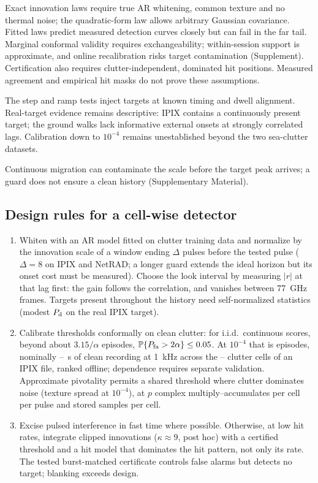 \documentclass[journal]{IEEEtran}
\newcommand{\PP}{\mathbb{P}}
\begin{document}
Exact innovation laws require true AR whitening, common texture and no thermal noise; the quadratic-form law allows arbitrary Gaussian covariance. Fitted laws predict measured detection curves closely but can fail in the far tail. Marginal conformal validity requires exchangeability; within-session support is approximate, and online recalibration risks target contamination (Supplement). Certification also requires clutter-independent, dominated hit positions. Measured agreement and empirical hit masks do not prove these assumptions.

The step and ramp tests inject targets at known timing and dwell alignment. Real-target evidence remains descriptive: IPIX contains a continuously present target; the ground walks lack informative external onsets at strongly correlated lags. Calibration down to $10^{-4}$ remains unestablished beyond the two sea-clutter datasets.

Continuous migration can contaminate the scale before the target peak arrives; a guard does not ensure a clean history (Supplementary Material).

\subsection{Design rules for a cell-wise detector}
\begin{enumerate}[leftmargin=*,itemsep=0pt]
\item Whiten with an AR model fitted on clutter training data and normalize by the innovation scale of a window ending $\Delta$ pulses before the tested pulse ($\Delta=8$ on IPIX and NetRAD; a longer guard extends the ideal horizon but its onset cost must be measured). Choose the look interval by measuring $|r|$ at that lag first: the gain follows the correlation, and vanishes between 77~GHz frames. Targets present throughout the history need self-normalized statistics (modest $P_{\rm d}$ on the real IPIX target).
\item Calibrate thresholds conformally on clean clutter: for i.i.d.\ continuous scores, beyond about $3.15/\alpha$ episodes, $\PP\{P_{\rm fa}>2\alpha\}\le0.05$. At $10^{-4}$ that is \CalEpisodesFour{} episodes, nominally \CalSecondsMin--\CalSecondsMax~s of clean recording at 1~kHz across the \CalCellsMin--\CalCellsMax{} clutter cells of an IPIX file, ranked offline; dependence requires separate validation. Approximate pivotality permits a shared threshold where clutter dominates noise (texture spread \LInConfSpreadFour{} at $10^{-4}$), at $p$ complex multiply--accumulates per cell per pulse and \StatePerCell{} stored samples per cell.
\item Excise pulsed interference in fast time where possible. Otherwise, at low hit rates, integrate clipped innovations ($\kappa\approx9$, post hoc) with a certified threshold and a hit model that dominates the hit pattern, not only its rate. The tested burst-matched certificate controls false alarms but detects no target; blanking exceeds design.
\end{enumerate}
\end{document}
